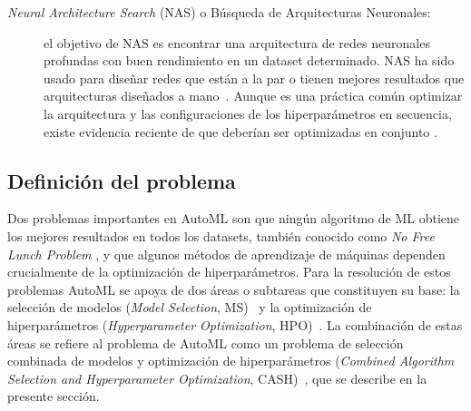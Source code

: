 \begin{description}
	\item [\textit{Neural Architecture Search} (NAS) o Búsqueda de Arquitecturas Neuronales:] el objetivo de NAS es encontrar una arquitectura de redes neuronales profundas con buen rendimiento en un dataset determinado. NAS ha sido usado para diseñar redes que están a la par o tienen mejores resultados que arquitecturas diseñados a mano~\cite{zoph2017learning, witsuba2019nas}. Aunque es una práctica común optimizar la arquitectura y las configuraciones de los hiperparámetros en secuencia, existe evidencia reciente de que deberían ser optimizadas en conjunto \cite{bischl2021hyperparameter}.
\end{description}

\subsection{Definición del problema}\label{subsec:automl_problem_definition}


Dos problemas importantes en AutoML son que ningún algoritmo de ML obtiene los mejores resultados en todos los datasets, también conocido como \textit{No Free Lunch Problem} \cite{wolpert1995no}, y que algunos métodos de aprendizaje de máquinas dependen crucialmente de la optimización de hiperparámetros. Para la resolución de estos problemas AutoML se apoya de dos áreas o subtareas que constituyen su base: la selección de modelos (\textit{Model Selection}, MS)~\cite{thornton2013auto} y la optimización de hiperparámetros (\textit{Hyperparameter Optimization}, HPO)~\cite{bischl2021hyperparameter}. La combinación de estas áreas se refiere al problema de AutoML como un problema de selección combinada de modelos y optimización de hiperparámetros (\textit{Combined Algorithm Selection and Hyperparameter Optimization}, CASH)~\cite{thornton2013auto}, que se describe en la presente sección.

